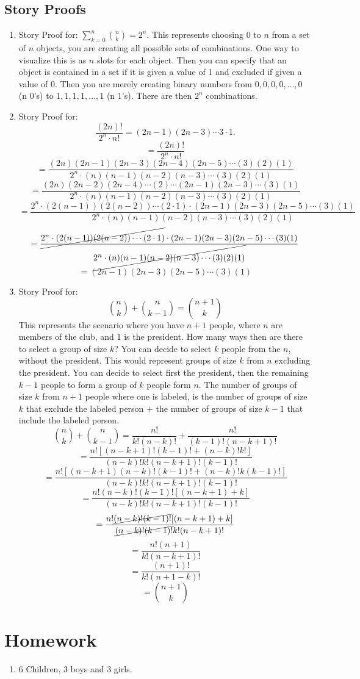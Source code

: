 \documentclass[11pt, oneside]{article}   	%
\begin{document}
\subsection{Story Proofs}
	\begin{enumerate}
		\item Story Proof for: $\sum_{k=0}^{n} \binom{n}{k} = 2^{n}$. This represents choosing 0 to $n$ from a set of $n$ objects, you are creating all possible sets of combinations. One way to visualize this is as $n$ slots for each object. Then you can specify that an object is contained in a set if it is given a value of 1 and excluded if given a value of 0. Then you are merely creating binary numbers from $0,0,0,0,...,0$ (n $0$'s) to $1,1,1,1,...,1$ (n $1$'s). There are then $2^{n}$ combinations.
		\item Story Proof for:
			\[
				\frac{(2n)!}{2^{n} \cdot n!} = (2n - 1)(2n - 3) \cdots 3 \cdot 1.
			\]
			\[
				= \frac{(2n)!}{2^{n} \cdot n!}
			\]
			\[
				= \frac{(2n)(2n-1)(2n-3)(2n-4)(2n-5) \cdots (3)(2)(1)}{2^{n} \cdot (n)(n-1)(n-2)(n-3) \cdots (3)(2)(1)}
			\]
			\[
				= \frac{(2n)(2n-2)(2n-4)  \cdots (2) \cdots (2n-1)(2n-3) \cdots (3)(1)}{2^{n} \cdot (n)(n-1)(n-2)(n-3) \cdots (3)(2)(1)}
			\]
			\[
				= \frac{2^{n} \cdot (2(n-1))(2(n-2)) \cdots (2 \cdot 1) \cdot (2n-1)(2n-3)(2n-5) \cdots (3)(1)}{2^{n} \cdot (n)(n-1)(n-2)(n-3) \cdots (3)(2)(1)}
			\]
			\vspace{4mm}
			\[
				= \frac{ \cancel{2^{n} \cdot (2(n-1))(2(n-2)) \cdots (2 \cdot 1)} \cdot (2n-1)(2n-3)(2n-5) \cdots (3)(1)}{\cancel{2^{n} \cdot (n)(n-1)(n-2)(n-3) \cdots (3)(2)(1)}}
			\]
			\vspace{4mm}
			\[
				= (2n-1)(2n-3)(2n-5) \cdots (3)(1)
			\]
		\item Story Proof for:
			\[
				\binom{n}{k} + \binom{n}{k-1} = \binom{n + 1}{k}
			\]
			This represents the scenario where you have $n + 1$ people, where $n$ are members of the club, and 1 is the president. How many ways then are there to select a group of size $k$? You can decide to select $k$ people from the $n$, without the president. This would represent groups of size $k$ from $n$ excluding the president. You can decide to select first the president, then the remaining $k-1$ people to form a group of $k$ people form $n$. The number of groups of size $k$ from $n+1$ people where one is labeled, is the number of groups of size $k$ that exclude the labeled person $+$ the number of groups of size $k-1$ that include the labeled person.
			\[
				\binom{n}{k} + \binom{n}{k-1} = \frac{n!}{k!(n-k)!} + \frac{n!}{(k-1)!(n-k+1)!}
			\]
			\[
				= \frac{n![(n-k+1)!(k-1)! + (n-k)!k!]}{(n-k)!k!(n-k+1)!(k-1)!}
			\]
			\[
				= \frac{n![(n-k+1)(n-k)!(k-1)! + (n-k)!k(k-1)!]}{(n-k)!k!(n-k+1)!(k-1)!}
			\]
			\[
				= \frac{n!(n-k)!(k-1)![(n-k+1) + k]}{(n-k)!k!(n-k+1)!(k-1)!}
			\]
			\[
				= \frac{n! \cancel{(n-k)!(k-1)!}[(n-k+1) + k]}{ \cancel{(n-k)!(k-1)!}k!(n-k+1)!}
			\]
			\[
				= \frac{n!(n+1)}{k!(n-k+1)!}
			\]
			\[
				= \frac{(n+1)!}{k!(n+1-k)!}
			\]
			\[
				= \binom{n+1}{k}
			\]
	\end{enumerate}
	

\pagebreak
\section{Homework}
	\begin{enumerate}
		\item 6 Children, 3 boys and 3 girls.
	\end{enumerate}
\end{document}
